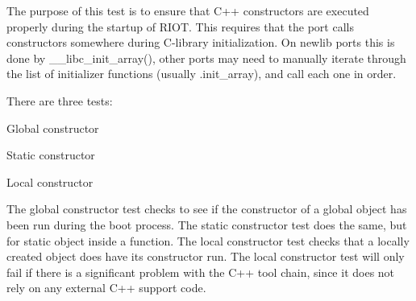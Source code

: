 The purpose of this test is to ensure that C++ constructors are executed properly during the startup of R\+I\+OT. This requires that the port calls constructors somewhere during C-\/library initialization. On newlib ports this is done by \+\_\+\+\_\+libc\+\_\+init\+\_\+array(), other ports may need to manually iterate through the list of initializer functions (usually .init\+\_\+array), and call each one in order.

There are three tests\+:
\begin{DoxyItemize}
\item Global constructor
\item Static constructor
\item Local constructor
\end{DoxyItemize}

The global constructor test checks to see if the constructor of a global object has been run during the boot process. The static constructor test does the same, but for static object inside a function. The local constructor test checks that a locally created object does have its constructor run. The local constructor test will only fail if there is a significant problem with the C++ tool chain, since it does not rely on any external C++ support code. 